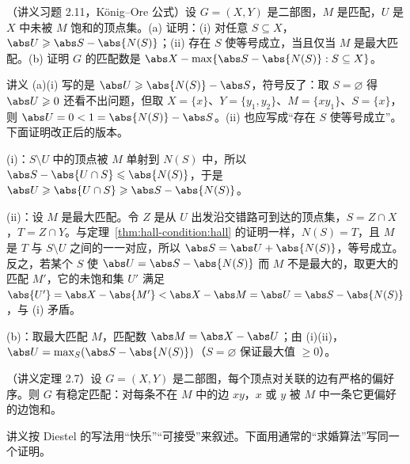\begin{workedexample}\label{we:hall-condition:konig-ore}
（讲义习题 2.11，König--Ore 公式）设 $G=(X,Y)$ 是二部图，$M$ 是匹配，$U$ 是 $X$ 中未被 $M$ 饱和的顶点集。(a) 证明：(i) 对任意 $S\subseteq X$，$\abs U\geqslant\abs S-\abs{N(S)}$；(ii) 存在 $S$ 使等号成立，当且仅当 $M$ 是最大匹配。(b) 证明 $G$ 的匹配数是 $\abs X-\max\{\abs S-\abs{N(S)}:S\subseteq X\}$。
\end{workedexample}
\begin{remark}[讲义原题有误]
讲义 (a)(i) 写的是 $\abs U\geqslant\abs{N(S)}-\abs S$，符号反了：取 $S=\varnothing$ 得 $\abs U\geqslant0$ 还看不出问题，但取 $X=\{x\}$、$Y=\{y_1,y_2\}$、$M=\{xy_1\}$、$S=\{x\}$，则 $\abs U=0<1=\abs{N(S)}-\abs S$。(ii) 也应写成“存在 $S$ 使等号成立”。下面证明改正后的版本。
\end{remark}
\begin{solution}
(i)：$S\setminus U$ 中的顶点被 $M$ 单射到 $N(S)$ 中，所以 $\abs S-\abs{U\cap S}\leqslant\abs{N(S)}$，于是 $\abs U\geqslant\abs{U\cap S}\geqslant\abs S-\abs{N(S)}$。

(ii)：设 $M$ 是最大匹配。令 $Z$ 是从 $U$ 出发沿交错路可到达的顶点集，$S=Z\cap X$，$T=Z\cap Y$。与定理~\ref{thm:hall-condition:hall} 的证明一样，$N(S)=T$，且 $M$ 是 $T$ 与 $S\setminus U$ 之间的一一对应，所以 $\abs S=\abs U+\abs{N(S)}$，等号成立。反之，若某个 $S$ 使 $\abs U=\abs S-\abs{N(S)}$ 而 $M$ 不是最大的，取更大的匹配 $M'$，它的未饱和集 $U'$ 满足 $\abs{U'}=\abs X-\abs{M'}<\abs X-\abs M=\abs U=\abs S-\abs{N(S)}$，与 (i) 矛盾。

(b)：取最大匹配 $M$，匹配数 $\abs M=\abs X-\abs U$；由 (i)(ii)，$\abs U=\max_S(\abs S-\abs{N(S)})$（$S=\varnothing$ 保证最大值 $\geqslant0$）。
\end{solution}


\begin{theorem}\label{thm:hall-condition:stable}
（讲义定理 2.7）设 $G=(X,Y)$ 是二部图，每个顶点对关联的边有严格的偏好序。则 $G$ 有稳定匹配：对每条不在 $M$ 中的边 $xy$，$x$ 或 $y$ 被 $M$ 中一条它更偏好的边饱和。
\end{theorem}

讲义按 Diestel 的写法用“快乐”“可接受”来叙述。下面用通常的“求婚算法”写同一个证明。

